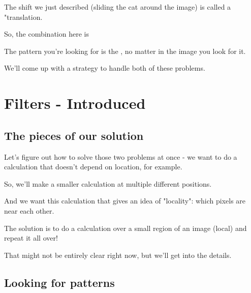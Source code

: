 \begin{itemize}
                    The shift we just described (sliding the cat around the image) is called a "translation.
                    
                    So, the combination here is\\
                    
                    \begin{definition}
                    
                         The pattern you're looking for is the , no matter  in the image you look for it. 
                    \end{definition}
                    
                    We'll come up with a strategy to handle both of these problems.
                
                
        
        
    \end{itemize}











\pagebreak
\section{Filters - Introduced}
    
    \subsection{The pieces of our solution}
    
        Let's figure out how to solve those two problems at once - we want to do a calculation that doesn't depend on location, for example.
        
        So, we'll make a smaller calculation at multiple different positions.
        
        And we want this calculation that gives an idea of "locality": which pixels are near each other.
        
        The solution is to do a calculation over a small region of an image (local) and repeat it all over!
        
        That might not be entirely clear right now, but we'll get into the details.
    
    \subsection{Looking for patterns}
    
